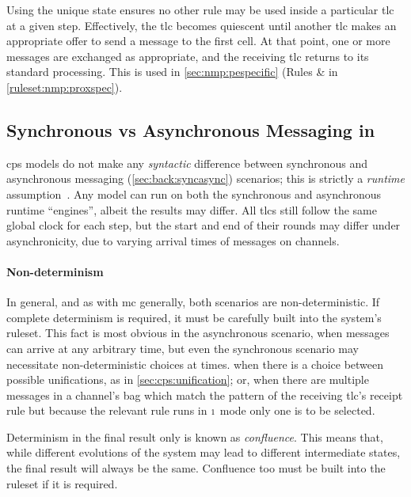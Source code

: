 Using the unique state ensures no other rule may be used inside a particular \gls{tlc} at a given step.  Effectively, the \gls{tlc} becomes quiescent until another \gls{tlc} makes an appropriate offer to send a message to the first cell.  At that point, one or more messages are exchanged as appropriate, and the receiving \gls{tlc} returns to its standard processing.  This is used \eg{} in \cref{sec:nmp:pespecific} (Rules  \&  in \vref{ruleset:nmp:proxspec}).


\subsection{\label{sec:cps:syncasync}Synchronous vs Asynchronous Messaging in }

\gls{cps} models do not make any \emph{syntactic} difference between synchronous and asynchronous messaging (\cref{sec:back:syncasync}) scenarios;
this is strictly a \emph{runtime} assumption~\cite{Nicolescu2012}.
Any model can run on both the synchronous and asynchronous runtime ``engines'', albeit the results may differ.  All \glspl{tlc} still follow the same global clock for each step, but the start and end of their rounds may differ under asynchronicity, due to varying arrival times of messages on channels.

\paragraph{Non-determinism}
In general, and as with \gls{mc} generally, both scenarios are non-deterministic.  If complete determinism is required, it must be carefully built into the system's \gls{ruleset}.  This fact is most obvious in the asynchronous scenario, when messages can arrive at any arbitrary time, but even the synchronous scenario may necessitate non-deterministic choices at times. \Eg{} when there is a choice between possible
unifications, as in \cref{sec:cps:unification}; or, when there are multiple messages in a channel’s bag
which match the pattern of the receiving \gls{tlc}’s receipt rule but because the relevant rule runs in \({\scriptstyle 1}\) mode only one is to be selected.

Determinism in the final result only is known as \emph{confluence}.  This means that, while different evolutions of the system may lead to different intermediate states, the final result will always be the same.  Confluence too must be built into the \gls{ruleset} if it is required.

